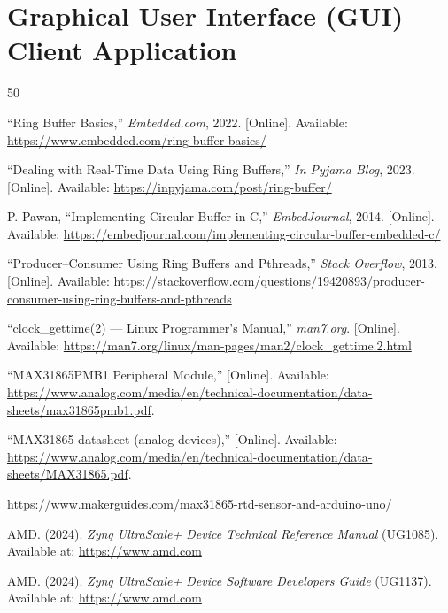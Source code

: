 \documentclass[11pt, a4paper]{report}
\begin{document}
\chapter{Graphical User Interface (GUI)
Client Application}	



\clearpage
\begin{thebibliography}{50}

``Ring Buffer Basics,'' \emph{Embedded.com}, 2022. [Online]. Available:
\url{https://www.embedded.com/ring-buffer-basics/}

``Dealing with Real-Time Data Using Ring Buffers,'' \emph{In Pyjama Blog}, 2023. [Online]. Available:
\url{https://inpyjama.com/post/ring-buffer/}

P. Pawan, ``Implementing Circular Buffer in C,'' \emph{EmbedJournal}, 2014. [Online]. Available:
\url{https://embedjournal.com/implementing-circular-buffer-embedded-c/}

``Producer--Consumer Using Ring Buffers and Pthreads,'' \emph{Stack Overflow}, 2013. [Online]. Available:
\url{https://stackoverflow.com/questions/19420893/producer-consumer-using-ring-buffers-and-pthreads}

``clock\_gettime(2) --- Linux Programmer's Manual,'' \emph{man7.org}. [Online]. Available:
\url{https://man7.org/linux/man-pages/man2/clock_gettime.2.html}

``MAX31865PMB1 Peripheral Module,'' [Online]. Available:
\url{https://www.analog.com/media/en/technical-documentation/data-sheets/max31865pmb1.pdf}.

``MAX31865 datasheet (analog devices),'' [Online]. Available:
\url{https://www.analog.com/media/en/technical-documentation/data-sheets/MAX31865.pdf}.

\url{https://www.makerguides.com/max31865-rtd-sensor-and-arduino-uno/}




AMD. (2024). \textit{Zynq UltraScale+ Device Technical Reference Manual} (UG1085). Available at: \url{https://www.amd.com}

AMD. (2024). \textit{Zynq UltraScale+ Device Software Developers Guide} (UG1137). Available at: \url{https://www.amd.com}


\end{thebibliography}
\end{document}
